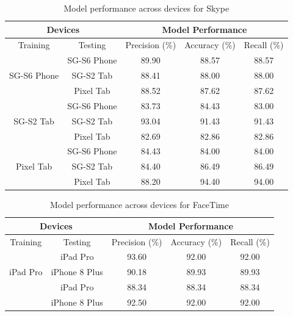 \begin{table}[t]
\centering
\caption{Model performance across devices for Skype}
\label{label:skype-devices}
    \begin{tabular}{|c|c|c|c|c|}
\hline
\multicolumn{2}{|c|}{Devices}                & \multicolumn{3}{c|}{Model Performance}             \\ \hline
    \multicolumn{1}{|c|}{Training} & Testing     & \multicolumn{1}{c|}{Precision (\%)} & {Accuracy (\%)} & {Recall (\%)} \\ \hline
\multirow{3}{*}{SG-S6 Phone}   & SG-S6 Phone & 89.90  & 88.57 & 88.57       \\ \cline{2-5} 
                               & SG-S2 Tab   & 88.41  & 88.00 & 88.00       \\ \cline{2-5} 
                               & Pixel Tab   & 88.52  & 87.62 & 87.62       \\ \hline
\multirow{3}{*}{SG-S2 Tab}     & SG-S6 Phone & 83.73  & 84.43 & 83.00       \\ \cline{2-5} 
                               & SG-S2 Tab   & 93.04  & 91.43 & 91.43       \\ \cline{2-5} 
                               & Pixel Tab   & 82.69  & 82.86 & 82.86       \\ \hline
\multirow{3}{*}{Pixel Tab}     & SG-S6 Phone & 84.43  & 84.00 & 84.00       \\ \cline{2-5} 
                               & SG-S2 Tab   & 84.40  & 86.49 & 86.49       \\ \cline{2-5} 
                               & Pixel Tab   & 88.20  & 94.40 & 94.00       \\ \hline
\end{tabular}
\end{table}

\begin{table}[t]
\centering
\caption{Model performance across devices for FaceTime}
\label{label:facetime-devices}
\begin{tabular}{|c|c|c|c|c|}
\hline
\multicolumn{2}{|c|}{Devices}                & \multicolumn{3}{c|}{Model Performance}             \\ \hline
    \multicolumn{1}{|c|}{Training} & Testing     & \multicolumn{1}{c|}{Precision (\%)} & {Accuracy (\%)} & {Recall (\%)} \\ \hline
\multirow{3}{*}{iPad Pro}   & iPad Pro & 93.60  & 92.00 &   92.00     \\ \cline{2-5} 
                               & iPhone 8 Plus & 90.18  & 89.93 & 89.93       \\ \hline
\multirow{3}{*}{iPhone 8 Plus}     & iPad  Pro  & 88.34  & 88.34  & 88.34       \\ \cline{2-5}  
                               & iPhone 8 Plus  & 92.50  & 92.00 & 92.00       \\ \hline
\end{tabular}
\end{table}

